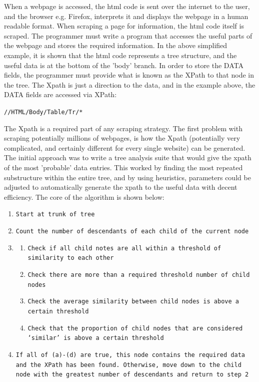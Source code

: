 \documentclass[11pt, oneside]{article}   	%
\begin{document}
When a webpage is accessed, the html code is sent over the internet to the user, and the browser e.g. Firefox, interprets it and displays the webpage in a human readable format. When scraping a page for information, the html code itself is scraped. The programmer must  write a program that accesses the useful parts of the webpage and stores the required information. In the above simplified example, it is shown that the html code represents a tree structure, and the useful data is at the bottom of the 'body' branch. In order to store the DATA fields, the programmer must provide what is known as the XPath to that node in the tree. The Xpath is just a direction to the data, and in the example above, the DATA fields are accessed via XPath:\begin{center} \texttt{//HTML/Body/Table/Tr/*}\end{center}
The Xpath is a required part of any scraping strategy. The first problem with scraping potentially millions of webpages, is how the Xpath (potentially very complicated, and certainly different for every single website) can be generated. The initial approach was to write a tree analysis suite that would give the xpath of the most 'probable' data entries. This worked by finding the most repeated substructure within the entire tree, and by using heuristics, parameters could be adjusted to automatically generate the xpath to the useful data with decent efficiency. 
The core of the algorithm is shown below: 
\begin{sloppypar}
\begin{enumerate}
\item \texttt{Start at trunk of tree}
\item \texttt{Count the number of descendants of each child of the current node}
\item 
\begin{enumerate}
\item \texttt{Check if all child notes are all within a threshold of similarity to each other}
\item \texttt{Check there are more than a required threshold number of child nodes}
\item \texttt{Check the average similarity between child nodes is above a certain threshold}
\item \texttt{Check that the proportion of child nodes that are considered `similar' is above a certain threshold}
\end{enumerate}
\item \texttt{If all of (a)-(d) are true, this node contains the required data and the XPath has been found. Otherwise, move down to the child node with the greatest number of descendants and return to step 2}
\end{enumerate}
\end{sloppypar}
\end{document}
